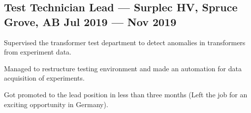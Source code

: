 \documentclass[letter,11pt]{article}
\begin{document}
\subsection{{Test Technician Lead --- Surplec HV,  Spruce Grove, AB \hfill Jul 2019 --- Nov 2019}}
\begin{zitemize}
	\item Supervised the transformer test department to detect anomalies in transformers from experiment data.
		\item Managed to restructure testing environment and made an automation for data acquisition of experiments.
	\item Got promoted to the lead position in less than three months (Left the job for an exciting opportunity in Germany).
\end{zitemize}


\end{document}
